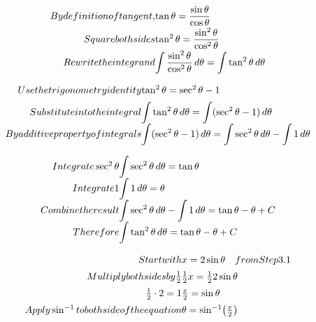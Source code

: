 \documentclass{article}
\begin{document}
\[
\begin{array}{@{}r@{}l@{}}
 By definition of tangent, &
 \tan\theta=\dfrac{\sin\theta}{\cos\theta}
 \\[1.2ex]
 Square both sides &
 \tan^2\theta=\dfrac{\sin^2\theta}{\cos^2\theta}
 \\[1.2ex]
 Rewrite the integrand &
 \displaystyle\int \dfrac{\sin^2\theta}{\cos^2\theta}\, d\theta
 =
 \displaystyle\int \tan^2\theta\, d\theta
 \end{array}
\]

\[
\begin{array}{@{}r@{}l@{}}
 Use the trigonometry identity &
 \tan^2\theta=\sec^2\theta-1
 \\[1.2ex]
 Substitute into the integral &
 \displaystyle\int \tan^2\theta \, d\theta
 =
 \displaystyle\int (\sec^2\theta-1) \, d\theta
 \\[1.2ex]
 By additive property of integrals &
 \displaystyle\int (\sec^2\theta-1)\, d\theta
 =
 \displaystyle\int \sec^2\theta\, d\theta-\displaystyle\int 1\, d\theta
 \end{array}
\]

\[
\begin{array}{@{}r@{}l@{}}
 Integrate \sec^2\theta
 &
 \displaystyle\int \sec^2\theta\, d\theta=\tan\theta
 \\[1.2ex]
 Integrate 1
 &
 \displaystyle\int 1\, d\theta=\theta
 \\[1.2ex]
 Combine the result &
 \displaystyle\int \sec^2\theta\, d\theta-\displaystyle\int 1\, d\theta
 =
 \tan\theta-\theta+C
 \\[1.2ex]
 Therefore &
 \displaystyle\int \tan^2\theta\, d\theta=\tan\theta-\theta+C
 \end{array}
\]

\[
\begin{array}{@{}r@{}l@{}}
 Start with &
 x=2\sin\theta\quad from Step 3.1 \\[1.2ex]
 Multiply both sides by \frac{1}{2}
 &
 \frac{1}{2} x
 =
 \frac{1}{2} 2\sin\theta
 \\[1.2ex]
 \frac{1}{2}\cdot 2=1 &
 \frac{x}{2}=\sin\theta
 \\[1.2ex]
 Apply \sin^{-1} to both side of the equation &
 \theta=\sin^{-1}\!\left(\frac{x}{2}\right)
 \end{array}
\]
\end{document}
